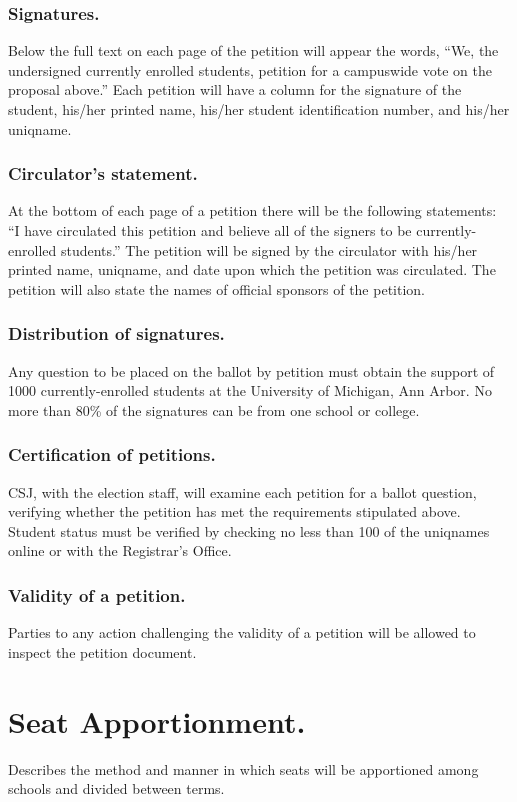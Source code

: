 \subsubsection{Signatures.}
Below the full text on each page of the petition will appear the words, ``We, the undersigned currently enrolled students, petition for a campuswide vote on the proposal above.''  Each petition will have a column for the signature of the student, his/her printed name, his/her student identification number, and his/her uniqname.
\subsubsection{Circulator's statement.}
At the bottom of each page of a petition there will be the following statements: ``I have circulated this petition and believe all of the signers to be currently-enrolled students.''  The petition will be signed by the circulator with his/her printed name, uniqname, and date upon which the petition was circulated.  The petition will also state the names of official sponsors of the petition.
\subsubsection{Distribution of signatures.}
Any question to be placed on the ballot by petition must obtain the support of 1000 currently-enrolled students at the University of Michigan, Ann Arbor.  No more than 80\% of the signatures can be from one school or college. 
\subsubsection{Certification of petitions.}
CSJ, with the election staff, will examine each petition for a ballot question, verifying whether the petition has met the requirements stipulated above.  Student status must be verified by checking no less than 100 of the uniqnames online or with the Registrar's Office.
\subsubsection{Validity of a petition.}
Parties to any action challenging the validity of a petition will be allowed to inspect the petition document.


\section{Seat Apportionment.}
Describes the method and manner in which seats will be apportioned among schools and divided between terms.
